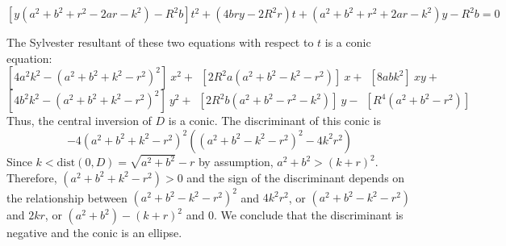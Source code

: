\[ [y(a^{2} + b^{2} + r^{2} - 2ar - k^{2}) - R^{2}b]t^{2} 
   + (4bry - 2R^{2}r) t
   + (a^{2} + b^{2} + r^{2} + 2ar - k^{2})y - R^{2}b = 0 \]

The Sylvester resultant of these two equations with respect to $t$
is a conic equation: 
\[ [4a^{2}k^{2} - (a^{2} + b^{2} + k^{2} - r^{2})^{2}]\ x^{2} + \ \ 
[2R^{2}a(a^{2} + b^{2} - k^{2} - r^{2})]\ x + \ \ 
[8abk^{2}]\ xy + 
\]
\[
[4b^{2}k^{2} - (a^{2}+b^{2}+k^{2}-r^{2})^{2}]\ y^{2} + \ \ 
[2R^{2}b(a^{2} + b^{2} - r^{2} - k^{2})]\ y - \ \ 
[R^{4}(a^{2} + b^{2} - r^{2})]
\]
%
%
%
%
Thus, the central inversion of $D$ is a conic.
The discriminant of this conic is 
\[ -4(a^{2} + b^{2} + k^{2} - r^{2})^{2} 
   ((a^{2} + b^{2} - k^{2} - r^{2})^{2} - 4k^{2}r^{2}) \]
Since $k < \mbox{dist}(0,D) = \sqrt{a^{2} + b^{2}} - r$ by assumption,
$a^{2} + b^{2} > (k+r)^{2}$.
Therefore, $(a^{2} + b^{2} + k^{2} - r^{2}) > 0$ and the sign
of the discriminant depends on the relationship between 
$(a^{2} + b^{2} - k^{2} - r^{2})^{2}$ and $4k^{2}r^{2}$,
or $(a^{2} + b^{2} - k^{2} - r^{2})$ and $2kr$,
or $(a^{2} + b^{2}) - (k + r)^{2}$ and $0$.
We conclude that the discriminant is negative and the conic is an ellipse.
\QED

